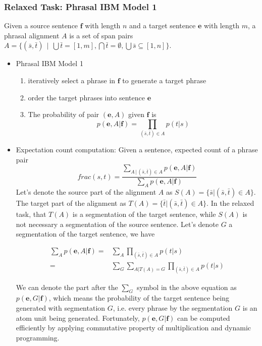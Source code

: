 \documentclass[11pt, letterpaper]{article}   	%
\begin{document}
\subsubsection{Relaxed Task: Phrasal IBM Model 1}
Given a source sentence $\mathbf{f}$ with length $n$ and a target sentence $\mathbf{e}$ with length $m$, a phrasal alignment $A$ is a set of span pairs $A=\{(\bar{s},\bar{t}) \, \mid \, \bigcup {\bar{t}} = [1,m], \bigcap {\bar{t}} = \emptyset,  \bigcup{\bar{s}} \subseteq [1,n] \}$.
\begin{itemize}
\item Phrasal IBM Model 1
\begin{enumerate}
\item iteratively select a phrase in $\mathbf{f}$ to generate a target phrase
\item order the target phrases into sentence $\mathbf{e}$
\item The probability of pair $(\textbf{e},A)$ given $\textbf{f}$ is 
\begin{equation} \label{eq:obj1}
p(\textbf{e},A|\textbf{f})=\prod_{(\bar{s},\bar{t})\in A}p(t|s)
\end{equation}
\end{enumerate}

\item Expectation count computation: Given a sentence, expected count of a phrase pair
\begin{equation}
frac(s,t)=\frac{\sum_{A \, | \,(\bar{s},\bar{t})\in A} p(\textbf{e},A|\textbf{f})}{\sum_{A} p(\textbf{e},A|\textbf{f})}
\end{equation}
Let's denote the source part of the alignment $A$ as $S(A)=\{\bar{s}|(\bar{s},\bar{t})\in A\}$. The target part of the alignment as $T(A)=\{\bar{t}|(\bar{s},\bar{t})\in A\}$. In the relaxed task, that $T(A)$ is a segmentation of the target sentence, while $S(A)$ is not necessary a segmentation of the source sentence. Let's denote $G$ a segmentation of the target sentence, we have
 
\begin{align}
\sum_{A} p(\textbf{e},A|\textbf{f})=&\sum_{A} \prod_{(\bar{s},\bar{t})\in A} p(t|s)\\
=&\sum_{G} \sum_{A|T(A)=G} \prod_{(\bar{s},\bar{t})\in A} p(t|s)
\end{align}

We can denote the part after the $\sum_{G}$ symbol in the above equation as $p(\textbf{e},G | \textbf{f})$, which means the probability of the target sentence being generated with segmentation $G$, i.e. every phrase by the segmentation $G$ is an atom unit being generated. Fortunately, $p(\textbf{e},G | \textbf{f})$ can be computed efficiently by applying commutative property of multiplication and dynamic programming.


\end{itemize}
\end{document}
